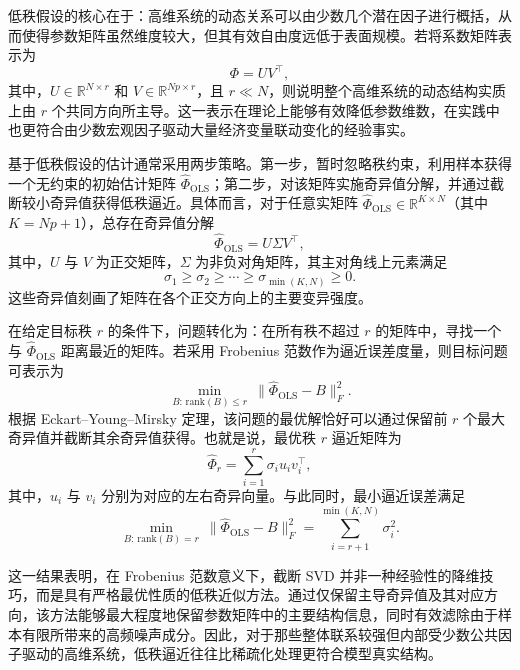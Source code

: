 \documentclass[UTF8,a4paper,12pt]{ctexbook}
\begin{document}
低秩假设的核心在于：高维系统的动态关系可以由少数几个潜在因子进行概括，从而使得参数矩阵虽然维度较大，但其有效自由度远低于表面规模。若将系数矩阵表示为
\begin{equation}
 \Phi=UV^{\top},
\end{equation}
其中，$U\in\mathbb{R}^{N\times r}$ 和 $V\in\mathbb{R}^{Np\times r}$，且 $r\ll N$，则说明整个高维系统的动态结构实质上由 $r$ 个共同方向所主导。这一表示在理论上能够有效降低参数维数，在实践中也更符合由少数宏观因子驱动大量经济变量联动变化的经验事实。

基于低秩假设的估计通常采用两步策略。第一步，暂时忽略秩约束，利用样本获得一个无约束的初始估计矩阵 $\hat{\Phi}_{\mathrm{OLS}}$；第二步，对该矩阵实施奇异值分解，并通过截断较小奇异值获得低秩逼近。具体而言，对于任意实矩阵 $\hat{\Phi}_{\mathrm{OLS}}\in\mathbb{R}^{K\times N}$（其中 $K=Np+1$），总存在奇异值分解
\begin{equation}
 \hat{\Phi}_{\mathrm{OLS}}=U\Sigma V^{\top},
\end{equation}
其中，$U$ 与 $V$ 为正交矩阵，$\Sigma$ 为非负对角矩阵，其主对角线上元素满足
\begin{equation}
 \sigma_1\geq \sigma_2\geq \cdots \geq \sigma_{\min(K,N)}\geq 0.
\end{equation}
这些奇异值刻画了矩阵在各个正交方向上的主要变异强度。

在给定目标秩 $r$ 的条件下，问题转化为：在所有秩不超过 $r$ 的矩阵中，寻找一个与 $\hat{\Phi}_{\mathrm{OLS}}$ 距离最近的矩阵。若采用 Frobenius 范数作为逼近误差度量，则目标问题可表示为
\begin{equation}
 \min_{B:\,\mathrm{rank}(B)\leq r}\ \lVert \hat{\Phi}_{\mathrm{OLS}}-B\rVert_F^2.
\end{equation}
根据 Eckart--Young--Mirsky 定理，该问题的最优解恰好可以通过保留前 $r$ 个最大奇异值并截断其余奇异值获得。也就是说，最优秩 $r$ 逼近矩阵为
\begin{equation}
 \hat{\Phi}_r=\sum_{i=1}^{r}\sigma_i u_i v_i^{\top},
\end{equation}
其中，$u_i$ 与 $v_i$ 分别为对应的左右奇异向量。与此同时，最小逼近误差满足
\begin{equation}
 \min_{B:\,\mathrm{rank}(B)=r}\ \lVert \hat{\Phi}_{\mathrm{OLS}}-B\rVert_F^2
 =\sum_{i=r+1}^{\min(K,N)}\sigma_i^2.
\end{equation}

这一结果表明，在 Frobenius 范数意义下，截断 SVD 并非一种经验性的降维技巧，而是具有严格最优性质的低秩近似方法。通过仅保留主导奇异值及其对应方向，该方法能够最大程度地保留参数矩阵中的主要结构信息，同时有效滤除由于样本有限所带来的高频噪声成分。因此，对于那些整体联系较强但内部受少数公共因子驱动的高维系统，低秩逼近往往比稀疏化处理更符合模型真实结构。
\end{document}
